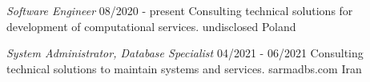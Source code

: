 \documentclass[a4paper,12pt]{memoir} %
\begin{document}

{\textit{Software Engineer}}
{08/2020 - present}
{Consulting technical solutions for development of computational services.}
{undisclosed}
{Poland}


{\textit{System Administrator, Database Specialist}}
{04/2021 - 06/2021}
{Consulting technical solutions to maintain systems and services.}
{sarmadbs.com}
{Iran}


\Sep %






\Sep %


\clearpage %

\userinformation %

\framebreak %



\end{document}
